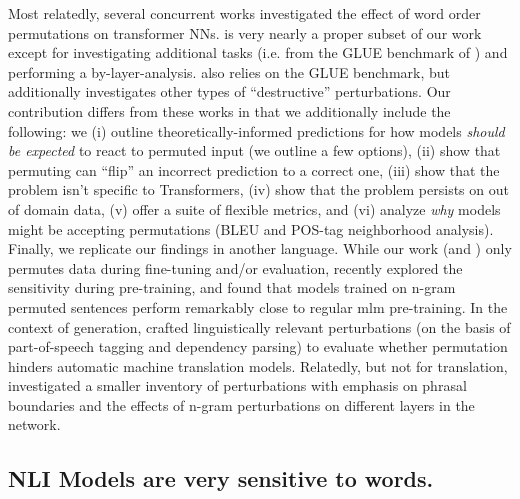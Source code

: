 \documentclass[letterpaper, 12pt]{report}
\begin{document}
Most relatedly, several concurrent works \citep{pham-etal-2020-out, alleman2021syntactic, gupta-etal-2021-bert, sinha-etal-2021-masked,parthasarathi-etal-2021-sometimes-want} investigated the effect of word order permutations on transformer NNs.  \cite{pham-etal-2020-out} is very nearly a proper subset of our work except for investigating additional tasks (i.e. from the GLUE benchmark of \citealt{wang-etal-2018-glue}) and performing a by-layer-analysis. \cite{gupta-etal-2021-bert} also relies on the GLUE benchmark, but additionally investigates other types of ``destructive'' perturbations. Our contribution differs from these works %
in that we additionally include the following: we (i) outline theoretically-informed predictions for how models \emph{should be expected} to react to permuted input (we outline a few options), (ii) show that permuting can ``flip'' an incorrect prediction to a correct one, (iii) show that the problem isn't specific to Transformers, (iv) show that the problem persists on out of domain data, (v) offer a suite of flexible metrics, and (vi) analyze \emph{why} models might be accepting permutations (BLEU and POS-tag neighborhood analysis). Finally, we replicate our findings in another language.
While our work (and \citeauthor{pham-etal-2020-out,gupta-etal-2021-bert}) only permutes data during fine-tuning and/or evaluation,
recently \citeauthor{sinha-etal-2021-masked} explored the sensitivity during pre-training, and found that models trained on n-gram permuted sentences perform remarkably close to regular \acrshort{mlm} pre-training.
In the context of generation, \cite{parthasarathi-etal-2021-sometimes-want} crafted linguistically relevant perturbations (on the basis of part-of-speech tagging and dependency parsing) to evaluate whether permutation hinders automatic machine translation models. Relatedly, but not for translation, \cite{alleman2021syntactic} investigated a smaller inventory of perturbations with emphasis on phrasal boundaries and the effects of n-gram perturbations on different layers in the network. %


\subsection{NLI Models are very sensitive to words.}
\end{document}
